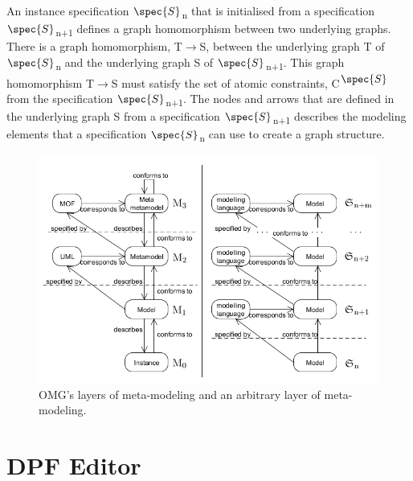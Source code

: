 An instance specification $\spec{S}$\textsubscript{n} that is initialised from
a specification $\spec{S}$\textsubscript{n+1} defines a graph homomorphism
between two underlying graphs. There is a graph homomorphism,
T$\longrightarrow$S, between the underlying graph T of
$\spec{S}$\textsubscript{n} and the underlying graph S of
$\spec{S}$\textsubscript{n+1}\cite{Lamo2013}. This graph homomorphism
T$\longrightarrow$S must satisfy the set of atomic constraints,
C\textsuperscript{$\spec{S}$} from the specification
$\spec{S}$\textsubscript{n+1}. The nodes and arrows that are defined in the
underlying graph S from a specification $\spec{S}$\textsubscript{n+1} describes
the modeling elements that a specification $\spec{S}$\textsubscript{n} can use
to create a graph structure.

\cite{Brambilla:MDSE}

\begin{figure}[H]
	\centering
	\includegraphics[scale=0.7]{./Figures/MOF_vs_DPF}
	\caption[OMG's layers of meta-modeling and multilayer modeling]
	{OMG's layers of meta-modeling and an arbitrary layer of meta-modeling.}
	\label{fig:MOF_vs_DPF}
\end{figure}



 
\section{DPF Editor}

